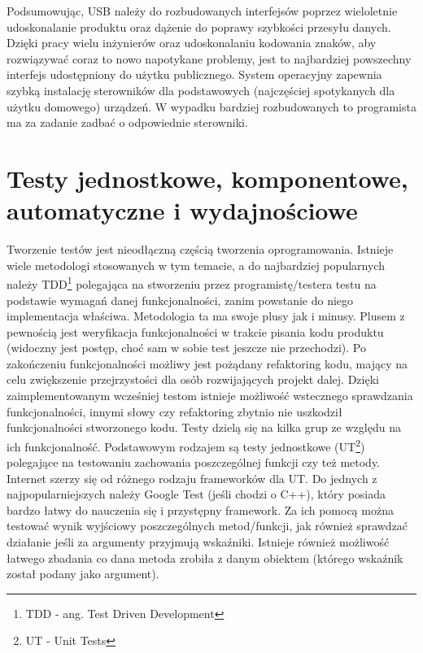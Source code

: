\documentclass{BscUS}
\begin{document}
\newline
\indent Podsumowując, USB należy do rozbudowanych interfejsów poprzez wieloletnie udoskonalanie produktu oraz dążenie do poprawy szybkości przesyłu danych. Dzięki pracy wielu inżynierów oraz udoskonalaniu kodowania znaków, aby rozwiązywać coraz to nowo napotykane problemy, jest to najbardziej powszechny interfejs udostępniony do użytku publicznego. System operacyjny zapewnia szybką instalację sterowników dla podstawowych (najczęściej spotykanych dla użytku domowego) urządzeń. W wypadku bardziej rozbudowanych to programista ma za zadanie zadbać o odpowiednie sterowniki.
\section{Testy jednostkowe, komponentowe, automatyczne i wydajnościowe}
\indent Tworzenie testów jest nieodłączną częścią tworzenia oprogramowania. Istnieje wiele metodologi stosowanych w tym temacie, a do najbardziej popularnych należy TDD\footnote{TDD - ang. Test Driven Development} polegająca na stworzeniu przez programistę/testera testu na podstawie wymagań danej funkcjonalności, zanim powstanie do niego implementacja właściwa. Metodologia ta ma swoje plusy jak i minusy. Plusem z pewnością jest weryfikacja funkcjonalności w trakcie pisania kodu produktu (widoczny jest postęp, choć sam w sobie test jeszcze nie przechodzi). Po zakończeniu funkcjonalności możliwy jest pożądany refaktoring kodu, mający na celu zwiększenie przejrzystości dla osób rozwijających projekt dalej. Dzięki zaimplementowanym wcześniej testom istnieje możliwość wstecznego sprawdzania funkcjonalności, innymi słowy czy refaktoring zbytnio nie uszkodził funkcjonalności stworzonego kodu.
\newline
\indent Testy dzielą się na kilka grup ze względu na ich funkcjonalność. Podstawowym rodzajem są testy jednostkowe (UT\footnote{UT - Unit Tests}) polegające na testowaniu zachowania poszczególnej funkcji czy też metody. Internet szerzy się od różnego rodzaju frameworków dla UT. Do jednych z najpopularniejszych należy Google Test (jeśli chodzi o C++), który posiada bardzo łatwy do nauczenia się i przystępny framework. Za ich pomocą można testować wynik wyjściowy poszczególnych metod/funkcji, jak również sprawdzać działanie jeśli za argumenty przyjmują wskaźniki. Istnieje również możliwość łatwego zbadania co dana metoda zrobiła z danym obiektem (którego wskaźnik został podany jako argument).
\newline
\end{document}
